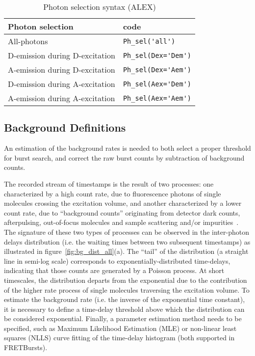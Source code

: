 \begin{table}
\begin{tabular}{l|l}
  Photon selection  & code \\
  \hline
  All-photons & \verb|Ph_sel('all')|\\
  D-emission during D-excitation & \verb|Ph_sel(Dex='Dem')|\\
  A-emission during D-excitation & \verb|Ph_sel(Dex='Aem')|\\
  D-emission during A-excitation & \verb|Ph_sel(Aex='Dem')|\\
  A-emission during A-excitation & \verb|Ph_sel(Aex='Aem')|\\
\end{tabular}
\caption{\label{tab:ph_sel_alex}Photon selection syntax (ALEX)}
\end{table}
\subsection{Background Definitions}
\label{sec:bg_intro}

An estimation of the background rates is needed to both select a proper threshold for
burst search, and correct the raw burst counts by subtraction of background counts.

The recorded stream of timestamps is the result of two processes: one characterized
by a high count rate, due to fluorescence photons of single molecules crossing the
excitation volume, and another characterized by a lower count rate, due to “background
counts” originating from detector dark counts, afterpulsing, out-of-focus molecules
and sample scattering and/or impurities~\cite{Gopich_2008}.
The signature of these two types of processes can be
observed in the inter-photon delays distribution (i.e. the waiting times
between two subsequent timestamps) as illustrated in figure~\ref{fig:bg_dist_all}(a).
The “tail” of the distribution (a straight line in semi-log scale) corresponds
to exponentially-distributed time-delays, indicating that those counts are generated by a
Poisson process. At short
timescales, the distribution departs from the exponential due to the contribution
of the higher rate process of single molecules traversing the excitation volume.
To estimate the background rate (i.e. the inverse of the exponential time constant),
it is necessary to define a time-delay threshold above which the distribution
can be considered exponential.
Finally, a parameter estimation method needs to be specified, such as Maximum
Likelihood Estimation (MLE) or non-linear least squares (NLLS) curve fitting of 
the time-delay histogram (both supported in FRETBursts).

